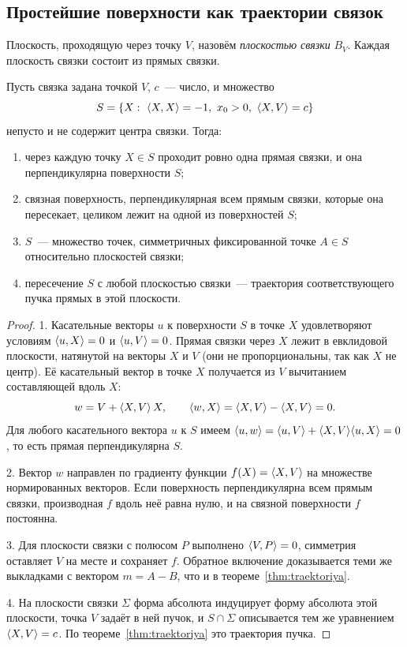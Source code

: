 \subsection{Простейшие поверхности как траектории связок}

Плоскость, проходящую через точку $V$, назовём \emph{плоскостью связки} $B_V$. Каждая плоскость связки состоит из прямых связки.

\begin{theorem}\label{thm:svyazka}
Пусть связка задана точкой $V$, $c$~--- число, и множество
\[
S=\{X:\ \sk{X}{X}=-1,\ x_0>0,\ \sk{X}{V}=c\}
\]
непусто и не содержит центра связки. Тогда:
\begin{enumerate}
  \item через каждую точку $X\in S$ проходит ровно одна прямая связки, и она перпендикулярна поверхности $S$;
  \item связная поверхность, перпендикулярная всем прямым связки, которые она пересекает, целиком лежит на одной из поверхностей $S$;
  \item $S$~--- множество точек, симметричных фиксированной точке $A\in S$ относительно плоскостей связки;
  \item пересечение $S$ с любой плоскостью связки~--- траектория соответствующего пучка прямых в этой плоскости.
\end{enumerate}
\end{theorem}
\begin{proof}
1. Касательные векторы $u$ к поверхности $S$ в точке $X$ удовлетворяют условиям $\langle u,X\rangle=0$ и $\langle u,V\rangle=0$. Прямая связки через $X$ лежит в евклидовой плоскости, натянутой на векторы $X$ и $V$ (они не пропорциональны, так как $X$ не центр). Её касательный вектор в точке $X$ получается из $V$ вычитанием составляющей вдоль $X$:
\[
w=V+\langle X,V\rangle\,X,\qquad \langle w,X\rangle=\langle X,V\rangle-\langle X,V\rangle=0.
\]
Для любого касательного вектора $u$ к $S$ имеем $\langle u,w\rangle=\langle u,V\rangle+\langle X,V\rangle\langle u,X\rangle=0$, то есть прямая перпендикулярна $S$.

2. Вектор $w$ направлен по градиенту функции $f(X)=\langle X,V\rangle$ на множестве нормированных векторов. Если поверхность перпендикулярна всем прямым связки, производная $f$ вдоль неё равна нулю, и на связной поверхности $f$ постоянна.

3. Для плоскости связки с полюсом $P$ выполнено $\langle V,P\rangle=0$, симметрия оставляет $V$ на месте и сохраняет $f$. Обратное включение доказывается теми же выкладками с вектором $m=A-B$, что и в теореме~\ref{thm:traektoriya}.

4. На плоскости связки $\Sigma$ форма абсолюта индуцирует форму абсолюта этой плоскости, точка $V$ задаёт в ней пучок, и $S\cap\Sigma$ описывается тем же уравнением $\langle X,V\rangle=c$. По теореме~\ref{thm:traektoriya} это траектория пучка.
\end{proof}

